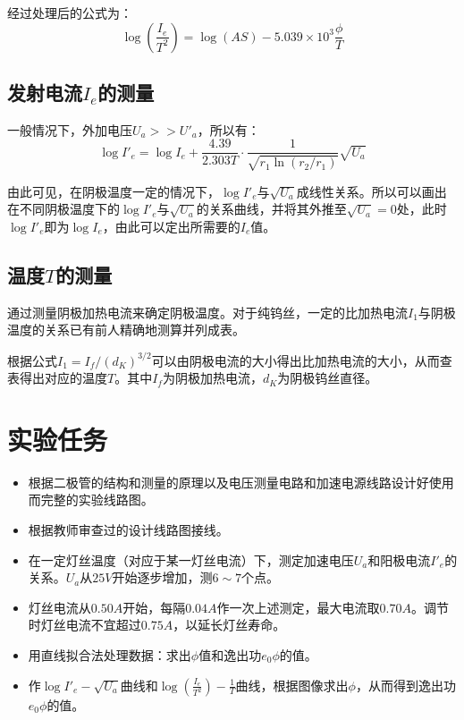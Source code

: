 \documentclass[a4paper]{article}
\begin{document}
\par 经过处理后的公式为：
$$\log(\frac{I_e}{T^2})=\log(AS)-5.039\times 10^3\frac{\phi}{T}$$

\subsection{发射电流$I_e$的测量}

\par 一般情况下，外加电压$U_a>>U'_a$，所以有：
$$\log I'_e=\log I_e+\frac{4.39}{2.303T}\cdot\frac{1}{\sqrt{r_1\ln(r_2/r_1)}}\sqrt{U_a}$$
\par 由此可见，在阴极温度一定的情况下，$\log I'_e$与$\sqrt{U_a}$成线性关系。所以可以画出在不同阴极温度下的$\log I'_e$与$\sqrt{U_a}$的关系曲线，并将其外推至$\sqrt{U_a}=0$处，此时$\log I'_e$即为$\log I_e$，由此可以定出所需要的$I_e$值。

\subsection{温度$T$的测量}

\par 通过测量阴极加热电流来确定阴极温度。对于纯钨丝，一定的比加热电流$I_1$与阴极温度的关系已有前人精确地测算并列成表。

\par 根据公式$I_1=I_f/(d_K)^{3/2}$可以由阴极电流的大小得出比加热电流的大小，从而查表得出对应的温度$T$。其中$I_f$为阴极加热电流，$d_K$为阴极钨丝直径。

\section{实验任务}

\begin{itemize}
	\item 根据二极管的结构和测量的原理以及电压测量电路和加速电源线路设计好使用而完整的实验线路图。
	\item 根据教师审查过的设计线路图接线。
	\item 在一定灯丝温度（对应于某一灯丝电流）下，测定加速电压$U_a$和阳极电流$I'_e$的关系。$U_a$从$25V$开始逐步增加，测$6\sim7$个点。
	\item 灯丝电流从$0.50A$开始，每隔$0.04A$作一次上述测定，最大电流取$0.70A$。调节时灯丝电流不宜超过$0.75A$，以延长灯丝寿命。
	\item 用直线拟合法处理数据：求出$\phi$值和逸出功$e_0\phi$的值。
	\item 作$\log I'_e-\sqrt{U_a}$曲线和$\log(\frac{I_e}{T^2})-\frac{1}{T}$曲线，根据图像求出$\phi$，从而得到逸出功$e_0\phi$的值。
\end{itemize}
\end{document}

